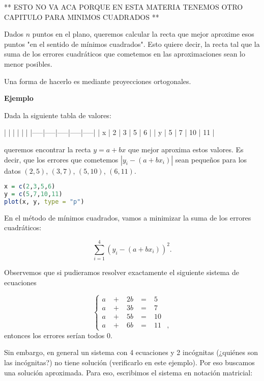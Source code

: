 ** ESTO NO VA ACA PORQUE EN ESTA MATERIA TENEMOS OTRO CAPITULO PARA MINIMOS CUADRADOS **
\begin{aplicacion}

Dados $n$ puntos en el plano, queremos calcular la recta que mejor aproxime esos puntos "en el sentido de mínimos cuadrados". Esto quiere decir, la recta tal que la suma de los errores cuadráticos que cometemos en las aproximaciones sean lo menor posibles.

Una forma de hacerlo es mediante proyecciones ortogonales.

\textbf{Ejemplo}

Dada la siguiente tabla de valores:

|     |     |     |     |     |
|-----|-----|-----|-----|-----|
| x   | 2   | 3   | 5   | 6   |
| y   | 5   | 7   | 10  | 11  |

queremos encontrar la recta $y = a+bx$ que mejor aproxima estos valores. Es decir, que los errores que cometemos $|y_i - (a+b x_i)|$ sean pequeños para los datos $(2, 5)$, $(3, 7)$, $(5, 10)$, $(6, 11)$.

\begin{lstlisting}[language=R]
x = c(2,3,5,6)
y = c(5,7,10,11)
plot(x, y, type = "p")
\end{lstlisting}

En el método de mínimos cuadrados, vamos a minimizar la suma de los errores cuadráticos:

$$
\sum_{i = 1}^4 (y_i - (a + bx_i))^2.
$$

Observemos que si pudieramos resolver exactamente el siguiente sistema de ecuaciones

$$
\left\{ {
\begin{alignedat}{5}
a&\;+\;&2b&\;=\;&5\\
a&\;+\;&3b&\;=\;&7 \\
a&\;+\;&5b&\;=\;&10\\
a&\;+\;&6b&\;=\;&11&,
\end{alignedat}}
\right.
$$entonces los errores serían todos $0$.

Sin embargo, en general un sistema con 4 ecuaciones y 2 incógnitas (¿quiénes son las incógnitas?) no tiene solución (verificarlo en este ejemplo). Por eso buscamos una solución aproximada. Para eso, escribimos el sistema en notación matricial:


\end{aplicacion}
